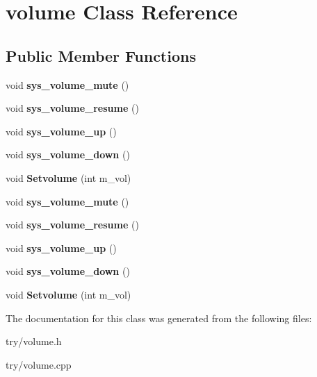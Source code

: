 \hypertarget{classvolume}{}\section{volume Class Reference}
\label{classvolume}
\subsection*{Public Member Functions}
\begin{DoxyCompactItemize}
\item 
\mbox{\label{classvolume_acb32f8518c862ac32db39e8d462181f4}} 
void {\bfseries sys\+\_\+volume\+\_\+mute} ()
\item 
\mbox{\label{classvolume_a813d47525f4400063bccc9b83fb8a416}} 
void {\bfseries sys\+\_\+volume\+\_\+resume} ()
\item 
\mbox{\label{classvolume_af3f84f9d632ca01ae718f53f5526672c}} 
void {\bfseries sys\+\_\+volume\+\_\+up} ()
\item 
\mbox{\label{classvolume_a57bdf7432cb7761fb5c2abc837f3bfa6}} 
void {\bfseries sys\+\_\+volume\+\_\+down} ()
\item 
\mbox{\label{classvolume_a1bdeb4b084ecb2c077a01585edeb5556}} 
void {\bfseries Setvolume} (int m\+\_\+vol)
\item 
\mbox{\label{classvolume_acb32f8518c862ac32db39e8d462181f4}} 
void {\bfseries sys\+\_\+volume\+\_\+mute} ()
\item 
\mbox{\label{classvolume_a813d47525f4400063bccc9b83fb8a416}} 
void {\bfseries sys\+\_\+volume\+\_\+resume} ()
\item 
\mbox{\label{classvolume_af3f84f9d632ca01ae718f53f5526672c}} 
void {\bfseries sys\+\_\+volume\+\_\+up} ()
\item 
\mbox{\label{classvolume_a57bdf7432cb7761fb5c2abc837f3bfa6}} 
void {\bfseries sys\+\_\+volume\+\_\+down} ()
\item 
\mbox{\label{classvolume_a1bdeb4b084ecb2c077a01585edeb5556}} 
void {\bfseries Setvolume} (int m\+\_\+vol)
\end{DoxyCompactItemize}


The documentation for this class was generated from the following files\+:\begin{DoxyCompactItemize}
\item 
try/volume.\+h\item 
try/volume.\+cpp\end{DoxyCompactItemize}
